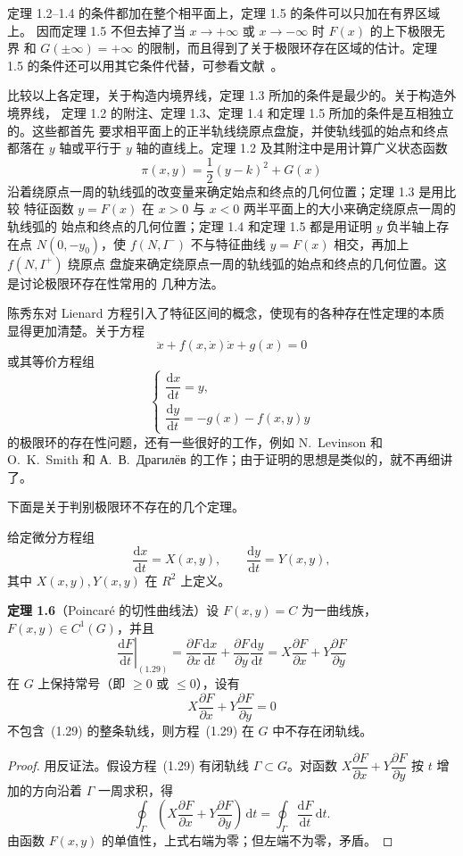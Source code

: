 定理 1.2--1.4 的条件都加在整个相平面上，定理 1.5 的条件可以只加在有界区域上。
因而定理 1.5 不但去掉了当 $x\to+\infty$ 或 $x\to-\infty$ 时 $F(x)$ 的上下极限无界
和 $G(\pm\infty)=+\infty$ 的限制，而且得到了关于极限环存在区域的估计。定理 1.5
的条件还可以用其它条件代替，可参看文献~\cite{12}。

比较以上各定理，关于构造内境界线，定理 1.3 所加的条件是最少的。关于构造外境界线，
定理 1.2 的附注、定理 1.3、定理 1.4 和定理 1.5 所加的条件是互相独立的。这些都首先
要求相平面上的正半轨线绕原点盘旋，并使轨线弧的始点和终点都落在 $y$ 轴或平行于
$y$ 轴的直线上。定理 1.2 及其附注中是用计算广义状态函数
\[
  \pi(x,y)=\dfrac12(y-k)^2+G(x)
\]
沿着绕原点一周的轨线弧的改变量来确定始点和终点的几何位置；定理 1.3 是用比较
特征函数 $y=F(x)$ 在 $x>0$ 与 $x<0$ 两半平面上的大小来确定绕原点一周的轨线弧的
始点和终点的几何位置；定理 1.4 和定理 1.5 都是用证明 $y$ 负半轴上存在点
$N(0,-y_0)$，使 $f(N,I^-)$ 不与特征曲线 $y=F(x)$ 相交，再加上 $f(N,I^+)$ 绕原点
盘旋来确定绕原点一周的轨线弧的始点和终点的几何位置。这是讨论极限环存在性常用的
几种方法。

陈秀东对 Lienard 方程引入了特征区间的概念\cite{18}，使现有的各种存在性定理的本质
显得更加清楚。关于方程
\[
  \ddot x+f(x,\dot x)\dot x+g(x)=0
\]
或其等价方程组
\[
  \begin{cases}
    \dfrac{\mathrm{d}x}{\mathrm{d}t}=y,\\
    \dfrac{\mathrm{d}y}{\mathrm{d}t}=-g(x)-f(x,y)y
  \end{cases}
\]
的极限环的存在性问题，还有一些很好的工作，例如 N.~Levinson 和 O.~K.~Smith\cite{19}
和 А.~В.~Драгилёв\cite{20} 的工作；由于证明的思想是类似的，就不再细讲了。

下面是关于判别极限环不存在的几个定理。

给定微分方程组
\[
  \dfrac{\mathrm{d}x}{\mathrm{d}t}=X(x,y),\qquad
  \dfrac{\mathrm{d}y}{\mathrm{d}t}=Y(x,y), \tag{1.29}
\]
其中 $X(x,y),Y(x,y)$ 在 $R^2$ 上定义。

\noindent\textbf{定理 1.6}\quad （Poincaré 的切性曲线法）设 $F(x,y)=C$ 为一曲线族，
$F(x,y)\in C^1(G)$，并且
\[
  \left.\dfrac{\mathrm{d}F}{\mathrm{d}t}\right|_{(1.29)}
  =\dfrac{\partial F}{\partial x}\dfrac{\mathrm{d}x}{\mathrm{d}t}
  +\dfrac{\partial F}{\partial y}\dfrac{\mathrm{d}y}{\mathrm{d}t}
  =X\dfrac{\partial F}{\partial x}+Y\dfrac{\partial F}{\partial y}
\]
在 $G$ 上保持常号（即 $\geq0$ 或 $\leq0$），设有
\[
  X\dfrac{\partial F}{\partial x}+Y\dfrac{\partial F}{\partial y}=0
\]
不包含~(1.29) 的整条轨线，则方程~(1.29) 在 $G$ 中不存在闭轨线。

\begin{proof}
用反证法。假设方程~(1.29) 有闭轨线 $\Gamma\subset G$。对函数
$X\dfrac{\partial F}{\partial x}+Y\dfrac{\partial F}{\partial y}$ 按 $t$ 增加的方向沿着
$\Gamma$ 一周求积，得
\[
  \oint_\Gamma\left(X\dfrac{\partial F}{\partial x}
  +Y\dfrac{\partial F}{\partial y}\right)\,\mathrm{d}t
  =\oint_\Gamma\dfrac{\mathrm{d}F}{\mathrm{d}t}\,\mathrm{d}t.
\]
由函数 $F(x,y)$ 的单值性，上式右端为零；但左端不为零，矛盾。
\end{proof}


